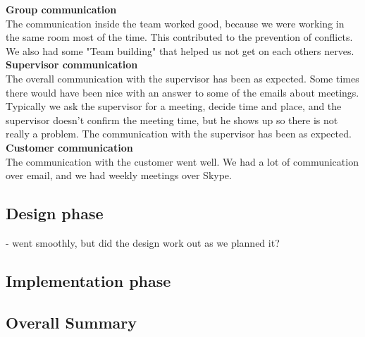         \indent \indent \textbf{Group communication} \\
        The communication inside the team worked good, because we were working in the same room most of the time. This contributed to the prevention of conflicts. We also had some "Team building" that helped us not get on each others nerves. 
        \\
        
        \textbf{Supervisor communication} \\
        The overall communication with the supervisor has been as expected. Some times there would have been nice with an answer to some of the emails about meetings. Typically we ask the supervisor for a meeting, decide time and place, and the supervisor doesn't confirm the meeting time, but he shows up so there is not really a problem. 
        The communication with the supervisor has been as expected. 
        \\ 
        
        \textbf{Customer communication} \\
        The communication with the customer went well. We had a lot of communication over email, and we had weekly meetings over Skype. 
        \\
        
        
    \subsection{Design phase} - went smoothly, but did the design work out as we planned it?
    \subsection{Implementation phase}
    \subsection{Overall Summary}    




